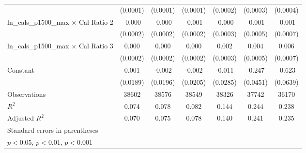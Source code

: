{\begin{tabular}{l*{6}{c}}
                    &    (0.0001)         &    (0.0001)         &    (0.0001)         &    (0.0002)         &    (0.0003)         &    (0.0004)         \\
\addlinespace
ln\_cals\_p1500\_max $\times$ Cal Ratio 2&      -0.000\sym{*}  &      -0.000\sym{*}  &      -0.001\sym{*}  &      -0.000         &      -0.001         &      -0.001         \\
                    &    (0.0002)         &    (0.0002)         &    (0.0002)         &    (0.0003)         &    (0.0005)         &    (0.0007)         \\
\addlinespace
ln\_cals\_p1500\_max $\times$ Cal Ratio 3&       0.000         &       0.000         &       0.000\sym{*}  &       0.002\sym{***}&       0.004\sym{***}&       0.006\sym{***}\\
                    &    (0.0002)         &    (0.0002)         &    (0.0002)         &    (0.0003)         &    (0.0005)         &    (0.0007)         \\
\addlinespace
Constant            &       0.001         &      -0.002         &      -0.002         &      -0.011         &      -0.247\sym{***}&      -0.623\sym{***}\\
                    &    (0.0189)         &    (0.0196)         &    (0.0205)         &    (0.0285)         &    (0.0451)         &    (0.0639)         \\
\midrule
Observations        &       38602         &       38576         &       38549         &       38326         &       37742         &       36170         \\
\(R^{2}\)           &       0.074         &       0.078         &       0.082         &       0.144         &       0.244         &       0.238         \\
Adjusted \(R^{2}\)  &       0.070         &       0.075         &       0.078         &       0.140         &       0.241         &       0.235         \\
\bottomrule
\multicolumn{7}{l}{\footnotesize Standard errors in parentheses}\\
\multicolumn{7}{l}{\footnotesize \sym{*} \(p<0.05\), \sym{**} \(p<0.01\), \sym{***} \(p<0.001\)}\\
\end{tabular}
}
